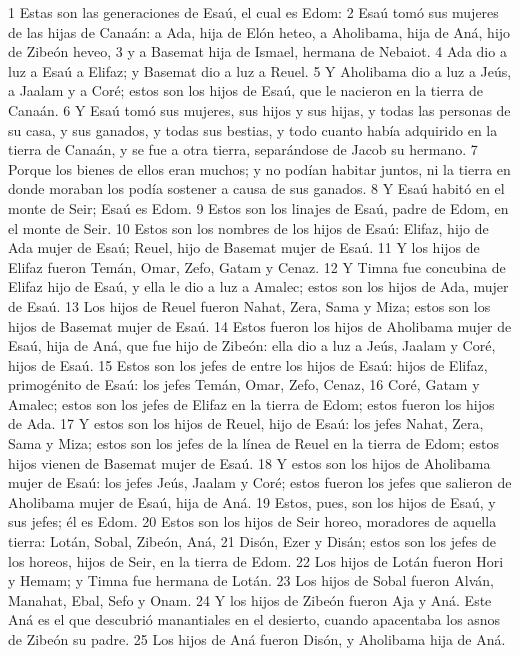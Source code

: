 1 Estas son las generaciones de Esaú, el cual es Edom:
2 Esaú tomó sus mujeres de las hijas de Canaán: a Ada, hija de Elón heteo, a Aholibama, hija de Aná, hijo de Zibeón heveo,
3 y a Basemat hija de Ismael, hermana de Nebaiot.
4 Ada dio a luz a Esaú a Elifaz; y Basemat dio a luz a Reuel.
5 Y Aholibama dio a luz a Jeús, a Jaalam y a Coré; estos son los hijos de Esaú, que le nacieron en la tierra de Canaán.
6 Y Esaú tomó sus mujeres, sus hijos y sus hijas, y todas las personas de su casa, y sus ganados, y todas sus bestias, y todo cuanto había adquirido en la tierra de Canaán, y se fue a otra tierra, separándose de Jacob su hermano.
7 Porque los bienes de ellos eran muchos; y no podían habitar juntos, ni la tierra en donde moraban los podía sostener a causa de sus ganados.
8 Y Esaú habitó en el monte de Seir; Esaú es Edom.
9 Estos son los linajes de Esaú, padre de Edom, en el monte de Seir.
10 Estos son los nombres de los hijos de Esaú: Elifaz, hijo de Ada mujer de Esaú; Reuel, hijo de Basemat mujer de Esaú.
11 Y los hijos de Elifaz fueron Temán, Omar, Zefo, Gatam y Cenaz.
12 Y Timna fue concubina de Elifaz hijo de Esaú, y ella le dio a luz a Amalec; estos son los hijos de Ada, mujer de Esaú.
13 Los hijos de Reuel fueron Nahat, Zera, Sama y Miza; estos son los hijos de Basemat mujer de Esaú.
14 Estos fueron los hijos de Aholibama mujer de Esaú, hija de Aná, que fue hijo de Zibeón: ella dio a luz a Jeús, Jaalam y Coré, hijos de Esaú.
15 Estos son los jefes de entre los hijos de Esaú: hijos de Elifaz, primogénito de Esaú: los jefes Temán, Omar, Zefo, Cenaz,
16 Coré, Gatam y Amalec; estos son los jefes de Elifaz en la tierra de Edom; estos fueron los hijos de Ada.
17 Y estos son los hijos de Reuel, hijo de Esaú: los jefes Nahat, Zera, Sama y Miza; estos son los jefes de la línea de Reuel en la tierra de Edom; estos hijos vienen de Basemat mujer de Esaú.
18 Y estos son los hijos de Aholibama mujer de Esaú: los jefes Jeús, Jaalam y Coré; estos fueron los jefes que salieron de Aholibama mujer de Esaú, hija de Aná.
19 Estos, pues, son los hijos de Esaú, y sus jefes; él es Edom.
20 Estos son los hijos de Seir horeo, moradores de aquella tierra: Lotán, Sobal, Zibeón, Aná,
21 Disón, Ezer y Disán; estos son los jefes de los horeos, hijos de Seir, en la tierra de Edom.
22 Los hijos de Lotán fueron Hori y Hemam; y Timna fue hermana de Lotán.
23 Los hijos de Sobal fueron Alván, Manahat, Ebal, Sefo y Onam.
24 Y los hijos de Zibeón fueron Aja y Aná. Este Aná es el que descubrió manantiales en el desierto, cuando apacentaba los asnos de Zibeón su padre.
25 Los hijos de Aná fueron Disón, y Aholibama hija de Aná.
